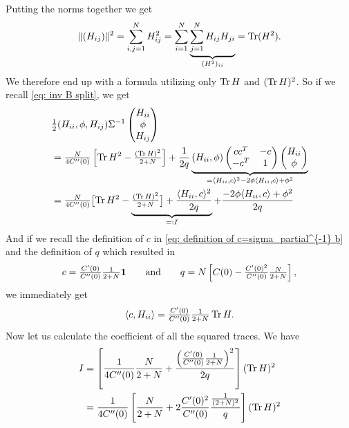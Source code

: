Putting the norms together we get
\begin{align*}
	\|(H_{ij})\|^2 = \sum_{i,j=1}^N H_{ij}^2
	= \sum_{i=1}^N \underbrace{\sum_{j=1}^N H_{ij}H_{ji}}_{(H^2)_{ii}}
	= \operatorname{Tr}(H^2).
\end{align*}
We therefore end up with a formula utilizing only \(\operatorname{Tr} H\) and \((\operatorname{Tr} H)^2\).
So if we recall \eqref{eq: inv B split}, we get
\begin{align*}
		&\tfrac12
		( H_{ii},\phi, H_{ij} )\Sigma^{-1}
		\begin{pmatrix}
			H_{ii}\\
			\phi\\
			H_{ij}
		\end{pmatrix}\\
		&= \tfrac{N}{4C''(0)}\left[
			\operatorname{Tr} H^2 - \tfrac{(\operatorname{Tr} H)^2}{2+N}
		\right]
		+ \frac1{2q} \underbrace{
			(H_{ii}, \phi)\begin{pmatrix}
			cc^T & -c\\
			-c^T & 1
		\end{pmatrix}
		\begin{pmatrix}
			H_{ii}\\ \phi
		\end{pmatrix}
		}_{
			= \langle H_{ii}, c\rangle^2 - 2\phi \langle H_{ii}, c\rangle + \phi^2
		}\\
		&= \tfrac{N}{4C''(0)}\bigl[
			\operatorname{Tr} H^2 - \underbrace{
				\tfrac{(\operatorname{Tr} H)^2}{2+N}
				\bigr]
				+ \frac{\langle H_{ii}, c\rangle^2}{2q}
			}_{=:I}
		 	+ \frac{- 2\phi \langle H_{ii}, c\rangle + \phi^2}{2q}
\end{align*}
And if we recall the definition of \(c\) in \eqref{eq: definition of
c=sigma_partial^{-1} b} and the definition of \(q\) which resulted in
\[
	c=\tfrac{C'(0)}{C''(0)}\tfrac{1}{2+N}\mathbf{1}
	\qquad \text{and} \qquad
	q=N\left[
		C(0) - \tfrac{C'(0)^2}{C''(0)}
		\tfrac{N}{2+N}
	\right],
\]
we immediately get
\[
	\langle c, H_{ii}\rangle = 
	\tfrac{C'(0)}{C''(0)}\tfrac{1}{2+N}\operatorname{Tr} H.
\]
Now let us calculate the coefficient of all the squared traces. We have
\begin{align*}
	I &= \left[
		\frac{1}{4C''(0)}\frac{N}{2+N} + 
		\frac{
			\left(\tfrac{C'(0)}{C''(0)}\tfrac{1}{2+N}\right)^2
		}{2q}
	\right](\operatorname{Tr} H)^2\\
	&= \frac{1}{4C''(0)}
	\left[
		\frac{N}{2+N} + 
		2\frac{C'(0)^2}{C''(0)}\frac{\frac1{(2+N)^2}}{q}
	\right](\operatorname{Tr} H)^2
\end{align*}